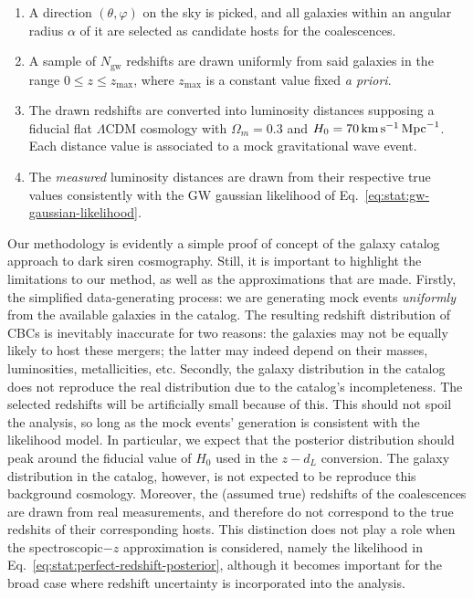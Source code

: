 \documentclass[%
preprint,
nofootinbib,
 amsmath,amssymb,
 aps,
]{revtex4-2}
\begin{document}
\begin{enumerate}
	\item A direction $(\theta, \varphi)$ on the sky is picked, and all galaxies within an angular radius
	      $\alpha$ of it are selected as candidate hosts for the coalescences.
	\item A sample of $N_\text{gw}$ redshifts are drawn uniformly from said galaxies in the range $0 \leq z
		      \leq z_\text{max}$, where $z_\text{max}$ is a constant value fixed \textit{a priori}.
	\item The drawn redshifts are converted into  luminosity distances supposing a fiducial flat
	      $\Lambda$CDM cosmology with $\Omega_m = 0.3$ and $H_0 = 70 \, \rm{km} \, \rm{s}^{-1} \,
		      \rm{Mpc}^{-1}$. Each distance value is associated to a mock gravitational wave event.
	\item The \textit{measured} luminosity distances are drawn from their respective true values consistently
	      with the GW gaussian likelihood of Eq.~\eqref{eq:stat:gw-gaussian-likelihood}.

\end{enumerate}

Our methodology is evidently a simple proof of concept of the galaxy catalog approach to dark siren
cosmography. Still, it is important to highlight the limitations to our method, as well as the
approximations that are made. Firstly, the simplified data-generating process: we are generating
mock events \textit{uniformly} from the available galaxies in the catalog. The resulting redshift
distribution of CBCs is inevitably inaccurate for two reasons: the galaxies may not be equally
likely to host these mergers; the latter may indeed depend on their masses, luminosities,
metallicities, etc. Secondly, the galaxy distribution in the catalog does not reproduce the real
distribution due to the catalog's incompleteness. The selected redshifts will be artificially small
because of this. This should not spoil the analysis, so long as the mock events' generation is
consistent with the likelihood model. In particular, we expect that the posterior distribution
should peak around the fiducial value of $H_0$ used in the $z-d_L$ conversion. The galaxy
distribution in the catalog, however, is not expected to be reproduce this background cosmology.
Moreover, the (assumed true) redshifts of the coalescences are drawn from real measurements, and
therefore do not correspond to the true redshits of their corresponding hosts. This distinction
does not play a role when the spectroscopic$-z$ approximation is considered, namely the likelihood
in Eq.~\eqref{eq:stat:perfect-redshift-posterior}, although it becomes important for the broad case
where redshift uncertainty is incorporated into the analysis.
\end{document}
